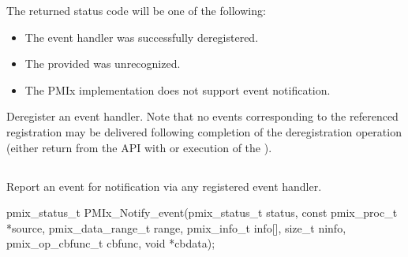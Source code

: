 The returned status code will be one of the following:

\begin{itemize}
\item {} The event handler was successfully deregistered.
\item {} The provided  was unrecognized.
\item {} The \ac{PMIx} implementation does not support event notification.
\end{itemize}

\descr

Deregister an event handler. Note that no events corresponding to the referenced registration may be delivered following completion of the deregistration operation (either return from the \ac{API} with  or execution of the ).

\subsection{}

\summary

Report an event for notification via any
registered event handler.

\format

\cspecificstart
\begin{codepar}
pmix_status_t
PMIx_Notify_event(pmix_status_t status,
                  const pmix_proc_t *source,
                  pmix_data_range_t range,
                  pmix_info_t info[], size_t ninfo,
                  pmix_op_cbfunc_t cbfunc, void *cbdata);
\end{codepar}
\cspecificend

\begin{arglist}
\end{arglist}

